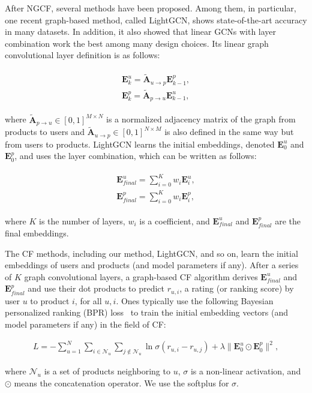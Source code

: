 \documentclass[sigconf]{acmart}
\begin{document}
After NGCF, several methods have been proposed. Among them, in particular, one recent graph-based method, called LightGCN, shows state-of-the-art accuracy in many datasets. In addition, it also showed that linear GCNs with layer combination work the best among many design choices. Its linear graph convolutional layer definition is as follows:
\begin{linenomath*}\begin{align}\begin{split}\label{eq:lgc}
    \bm{E}^u_k = \tilde{\bm{A}}_{u\rightarrow p}\bm{E}^p_{k-1},\\
    \bm{E}^p_k = \tilde{\bm{A}}_{p\rightarrow u}\bm{E}^u_{k-1},
\end{split}\end{align}\end{linenomath*}where $\tilde{\bm{A}}_{p\rightarrow u} \in [0,1]^{M \times N}$ is a normalized adjacency matrix of the graph from products to users and $\tilde{\bm{A}}_{u\rightarrow p} \in [0,1]^{N \times M}$ is also defined in the same way but from users to products. LightGCN learns the initial embeddings, denoted $\bm{E}^u_0$ and $\bm{E}^p_0$, and uses the layer combination, which can be written as follows:
\begin{linenomath*}\begin{align}\begin{split}\label{eq:comb}
    \bm{E}^u_{final} = \sum_{i=0}^{K}w_i\bm{E}^u_i,\\
    \bm{E}^p_{final} = \sum_{i=0}^{K}w_i\bm{E}^p_i,
\end{split}\end{align}\end{linenomath*}where $K$ is the number of layers, $w_i$ is a coefficient, and $\bm{E}^u_{final}$ and $\bm{E}^p_{final}$ are the final embeddings.

The CF methods, including our method, LightGCN, and so on, learn the initial embeddings of users and products (and model parameters if any). After a series of $K$ graph convolutional layers, a graph-based CF algorithm derives $\bm{E}^u_{final}$ and $\bm{E}^p_{final}$ and use their dot products to predict $r_{u,i}$, a rating (or ranking score) by user $u$ to product $i$, for all $u,i$. Ones typically use the following Bayesian personalized ranking (BPR) loss~\cite{10.5555/1795114.1795167} to train the initial embedding vectors (and model parameters if any) in the field of CF:
\begin{linenomath*}\begin{align}\label{eq:bpr}
L = -\sum_{u=1}^{N}\sum_{i \in \mathcal{N}_u}\sum_{j \notin \mathcal{N}_u} \ln \sigma (r_{u,i} - r_{u,j}) + \lambda \| \bm{E}^u_0 \odot \bm{E}^p_0 \|^2,
\end{align}\end{linenomath*}where $\mathcal{N}_u$ is a set of products neighboring to $u$, $\sigma$ is a non-linear activation, and $\odot$ means the concatenation operator. We use the softplus for $\sigma$.
\end{document}
